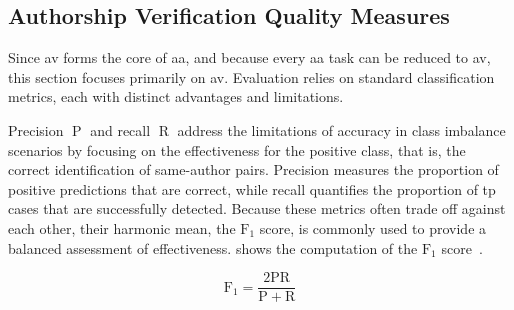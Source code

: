 \subsection{Authorship Verification Quality Measures}
\label{subsec:av_quality_measures}

Since \ac{av} forms the core of \ac{aa}, and because every \ac{aa} task can be reduced to \ac{av}, this section focuses primarily on \ac{av}. 
Evaluation relies on standard classification metrics, each with distinct advantages and limitations.



Precision $\operatorname{P}$ and recall $\operatorname{R}$ address the limitations of accuracy in class imbalance scenarios by focusing on the effectiveness for the positive class, that is, the correct identification of same-author pairs. 
Precision measures the proportion of positive predictions that are correct, while recall quantifies the proportion of \ac{tp} cases that are successfully detected. 
Because these metrics often trade off against each other, their harmonic mean, the $\operatorname{F_{1}}$ score, is commonly used to provide a balanced assessment of effectiveness. 
 shows the computation of the $\operatorname{F_{1}}$ score~\citep{neal_surveying_2018}.

\begin{equation}\label{eq:f1}
     \operatorname{F_{1}} = \frac{2\mathrm{P}  \mathrm{R}}{\mathrm{P} + \mathrm{R}}
\end{equation}

